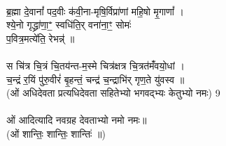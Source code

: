 \\
ब्र॒ह्मा दे॒वानां᳚ पद॒वीः क॑वी॒ना-मृषि॒र्विप्रा॑णां महि॒षो मृ॒गाणां᳚ ।\\
श्ये॒नो गृद्ध्रा॑णा॒ꣲ॒ स्वधि॑ति॒र् वना॑ना॒ꣳ॒ सोमः॑\\
प॒वित्र॒मत्ये॑ति॒ रेभन्न्॑ ॥\\
\\
स चि॑त्र चि॒त्रं चि॒तय॑न्त-म॒स्मे चित्र॑क्षत्र चि॒त्रत॑मंँवयो॒धां ।\\
च॒न्द्रं र॒यिं पु॑रु॒वीरं॑ बृ॒हन्तं॒ चन्द्र॑ च॒न्द्राभि॑र् गृण॒ते यु॑वस्व ॥\\
(ओं अधिदेवता प्रत्यधिदेवता सहितेभ्यो भगवद्भ्यः केतुभ्यो नमः) 9\\
\\
ओं आदित्यादि नवग्रह देवताभ्यो नमो नमः॥\\
(ओं शान्तिः॒ शान्तिः॒ शान्तिः॑ ॥)\\





